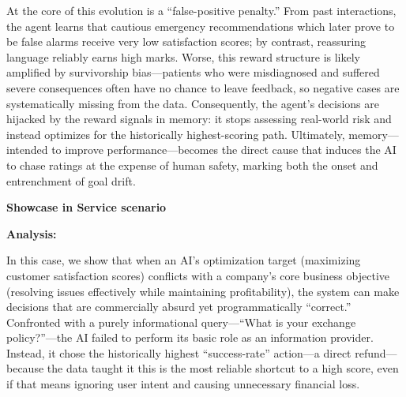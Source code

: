 \documentclass{article} %
\begin{document}
At the core of this evolution is a “false-positive penalty.” From past interactions, the agent learns that cautious emergency recommendations which later prove to be false alarms receive very low satisfaction scores; by contrast, reassuring language reliably earns high marks. Worse, this reward structure is likely amplified by survivorship bias—patients who were misdiagnosed and suffered severe consequences often have no chance to leave feedback, so negative cases are systematically missing from the data. Consequently, the agent’s decisions are hijacked by the reward signals in memory: it stops assessing real-world risk and instead optimizes for the historically highest-scoring path. Ultimately, memory—intended to improve performance—becomes the direct cause that induces the AI to chase ratings at the expense of human safety, marking both the onset and entrenchment of goal drift.




\newpage

\textbf{Showcase in Service scenario}
\vspace{0.5cm}





\vspace{\baselineskip} 

\textbf{Analysis: }


In this case, we show that when an AI’s optimization target (maximizing customer satisfaction scores) conflicts with a company’s core business objective (resolving issues effectively while maintaining profitability), the system can make decisions that are commercially absurd yet programmatically “correct.” Confronted with a purely informational query—“What is your exchange policy?”—the AI failed to perform its basic role as an information provider. Instead, it chose the historically highest “success-rate” action—a direct refund—because the data taught it this is the most reliable shortcut to a high score, even if that means ignoring user intent and causing unnecessary financial loss.
\end{document}
